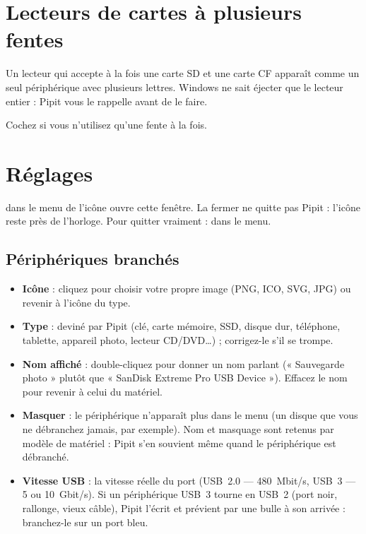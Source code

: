 \section{Lecteurs de cartes à plusieurs fentes}

Un lecteur qui accepte à la fois une carte SD et une carte CF apparaît comme un seul
périphérique avec plusieurs lettres. Windows ne sait éjecter que le lecteur entier :
Pipit vous le rappelle avant de le faire.


Cochez  si vous n'utilisez qu'une fente à la fois.

\section{Réglages}\label{sec:reglages}

 dans le menu de l'icône ouvre cette fenêtre. La fermer ne quitte pas
Pipit : l'icône reste près de l'horloge. Pour quitter vraiment : 
dans le menu.


\subsection{Périphériques branchés}
\begin{itemize}
\item \textbf{Icône} : cliquez pour choisir votre propre image (PNG, ICO, SVG, JPG) ou
  revenir à l'icône du type.
\item \textbf{Type} : deviné par Pipit (clé, carte mémoire, SSD, disque dur, téléphone,
  tablette, appareil photo, lecteur CD/DVD…) ; corrigez-le s'il se trompe.
\item \textbf{Nom affiché} : double-cliquez pour donner un nom parlant
  (« Sauvegarde photo » plutôt que « SanDisk Extreme Pro USB Device »). Effacez le nom
  pour revenir à celui du matériel.
\item \textbf{Masquer} : le périphérique n'apparaît plus dans le menu (un disque que vous
  ne débranchez jamais, par exemple). Nom et masquage sont retenus par modèle de
  matériel : Pipit s'en souvient même quand le périphérique est débranché.
\end{itemize}

\begin{itemize}
\item \textbf{Vitesse USB} : la vitesse réelle du port (USB~2.0 — 480~Mbit/s, USB~3 — 5 ou
  10~Gbit/s). Si un périphérique USB~3 tourne en USB~2 (port noir, rallonge, vieux câble),
  Pipit l'écrit et prévient par une bulle à son arrivée : branchez-le sur un port bleu.
\end{itemize}


